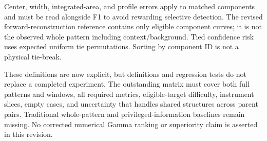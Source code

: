 \documentclass[sigconf,review,anonymous]{acmart}
\newenvironment{revision}{\ifdefined\markedcopy\color{red!70!black}\else\color{black}\fi}{}
\begin{document}
\begin{revision}
Center, width, integrated-area, and profile errors apply to matched
components and must be read alongside F1 to avoid rewarding selective
detection. The revised forward-reconstruction reference contains only
eligible component curves; it is not the observed whole pattern including
context/background. Tied confidence risk uses expected uniform
tie permutations. Sorting by component ID is not a physical tie-break.

These definitions are now explicit, but definitions and regression tests
do not replace a completed experiment. The outstanding matrix must cover
both full patterns and windows, all required metrics, eligible-target
difficulty, instrument slices, empty cases, and uncertainty that handles
shared structures across parent pairs. Traditional whole-pattern and
privileged-information baselines remain missing. No corrected numerical
Gamma ranking or superiority claim is asserted in this revision.
\end{revision}
\end{document}
